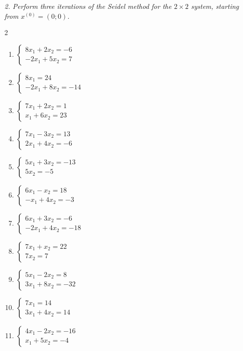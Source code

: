 \emph{2. Perform three iterations of the Seidel method for the $2\times2$ system, starting from $x^{(0)}=(0;0)$.}
\bigskip
\begin{multicols}{2}\raggedright
\begin{enumerate}[label=\arabic*., leftmargin=*]
\item $\begin{cases}8x_1+2x_2=-6\\-2x_1+5x_2=7\end{cases}$
\item $\begin{cases}8x_1=24\\-2x_1+8x_2=-14\end{cases}$
\item $\begin{cases}7x_1+2x_2=1\\x_1+6x_2=23\end{cases}$
\item $\begin{cases}7x_1-3x_2=13\\2x_1+4x_2=-6\end{cases}$
\item $\begin{cases}5x_1+3x_2=-13\\5x_2=-5\end{cases}$
\item $\begin{cases}6x_1-x_2=18\\-x_1+4x_2=-3\end{cases}$
\item $\begin{cases}6x_1+3x_2=-6\\-2x_1+4x_2=-18\end{cases}$
\item $\begin{cases}7x_1+x_2=22\\7x_2=7\end{cases}$
\item $\begin{cases}5x_1-2x_2=8\\3x_1+8x_2=-32\end{cases}$
\item $\begin{cases}7x_1=14\\3x_1+4x_2=14\end{cases}$
\item $\begin{cases}4x_1-2x_2=-16\\x_1+5x_2=-4\end{cases}$

\end{enumerate}
\end{multicols}

